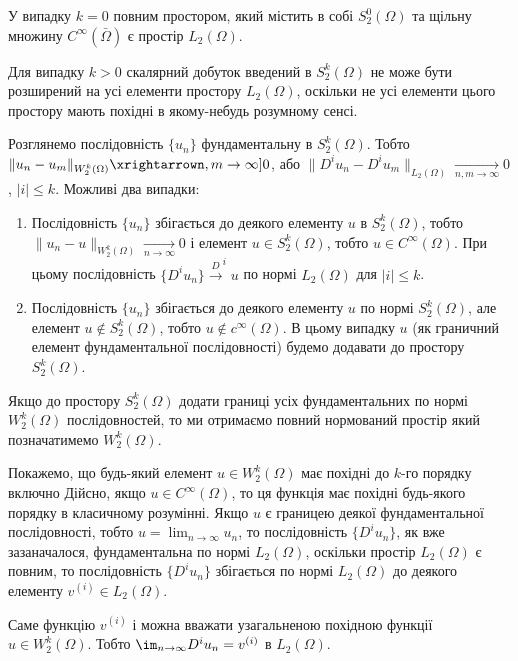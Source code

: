 У випадку $k = 0$ повним простором, який містить в собі $S_2^0(\Omega)$ та щільну %
множину $C^\infty(\bar \Omega)$ є простір $L_2(\Omega)$. \medskip

Для випадку $k > 0$ скалярний добуток введений в $S_2^k(\Omega)$ не може бути розширений на усі елементи простору $L_2(\Omega)$, оскільки не усі елементи цього простору мають похідні в якому-небудь розумному сенсі. \medskip

Розглянемо послідовність $\{u_n\}$ фундаментальну в $S_2^k(\Omega)$. Тобто $\|u_n - u_m\|_{W_2^k(\Omega)} \xrightarrown, m \to \infty]{} 0$, або $\|D^i u_n - D^i u_m\|_{L_2(\Omega)} \xrightarrow[n, m \to \infty]{} 0$, $|i| \le k$. Можливі два випадки:
\begin{enumerate}
    \item Послідовність $\{u_n\}$ збігається до деякого елементу $u$ в $S_2^k(\Omega)$, тобто $\|u_n - u\|_{W_2^k(\Omega)} \xrightarrow[n \to \infty]{} 0$ і елемент $u \in S_2^k(\Omega)$, тобто $u \in C^\infty(\Omega)$. При цьому послідовність $\{D^i u_n\} \xrightarrow D^i u$ по нормі $L_2(\Omega)$ для $|i| \le k$.
    \item Послідовність $\{u_n\}$ збігається до деякого елементу $u$ по нормі $S_2^k(\Omega)$, але елемент $u \not\in S_2^k(\Omega)$, тобто $u \not\in c^\infty(\Omega)$. В цьому випадку $u$ (як граничний елемент фундаментальної послідовності) будемо додавати до простору $S_2^k(\Omega)$.
\end{enumerate}

Якщо до простору $S_2^k(\Omega)$ додати границі усіх фундаментальних по нормі $W_2^k(\Omega)$ послідовностей, то ми отримаємо повний нормований простір який позначатимемо $W_2^k(\Omega)$. \medskip

Покажемо, що будь-який елемент $u \in W_2^k(\Omega)$ має похідні до $k$-го порядку включно Дійсно, якщо $u \in C^\infty(\Omega)$, то ця функція має похідні будь-якого порядку в класичному розумінні. Якщо $u$ є границею деякої фундаментальної послідовності, тобто $u = \lim_{n \to \infty} u_n$, то послідовність $\{D^i u_n\}$, як вже зазаначалося, фундаментальна по нормі $L_2(\Omega)$, оскільки простір $L_2(\Omega)$ є повним, то послідовність $\{D^i u_n\}$ збігається по нормі $L_2(\Omega)$ до деякого елементу $v^{(i)} \in L_2(\Omega)$.

\begin{definition}
    Саме функцію $v^{(i)}$ і можна вважати узагальненою похідною функції $u \in W_2^k(\Omega)$. Тобто $\im_{n \to \infty} D^i u_n = v^{(i)}$ в $L_2(\Omega)$. 
\end{definition}

